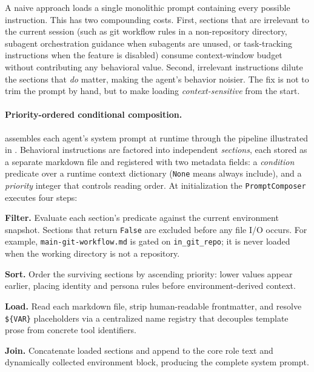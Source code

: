A naive approach loads a single monolithic prompt containing every possible instruction. This has two compounding costs. First, sections that are irrelevant to the current session (such as git workflow rules in a non-repository directory, subagent orchestration guidance when subagents are unused, or task-tracking instructions when the feature is disabled) consume context-window budget without contributing any behavioral value. Second, irrelevant instructions dilute the sections that \emph{do} matter, making the agent's behavior noisier. The fix is not to trim the prompt by hand, but to make loading \emph{context-sensitive} from the start.

\paragraph{Priority-ordered conditional composition.}

\name assembles each agent's system prompt at runtime through the pipeline illustrated in . Behavioral instructions are factored into independent \emph{sections}, each stored as a separate markdown file and registered with two metadata fields: a \emph{condition} predicate over a runtime context dictionary ({\tt None} means always include), and a \emph{priority} integer that controls reading order. At initialization the \texttt{PromptComposer} executes four steps:

\begin{packedenumerate}
\item \textbf{Filter.} Evaluate each section's predicate against the current environment snapshot. Sections that return \texttt{False} are excluded before any file I/O occurs. For example, \texttt{main-git-workflow.md} is gated on \texttt{in\_git\_repo}; it is never loaded when the working directory is not a repository.
\item \textbf{Sort.} Order the surviving sections by ascending priority: lower values appear earlier, placing identity and persona rules before environment-derived context.
\item \textbf{Load.} Read each markdown file, strip human-readable frontmatter, and resolve \texttt{\$\{VAR\}} placeholders via a centralized name registry that decouples template prose from concrete tool identifiers.
\item \textbf{Join.} Concatenate loaded sections and append to the core role text and dynamically collected environment block, producing the complete system prompt.
\end{packedenumerate}

